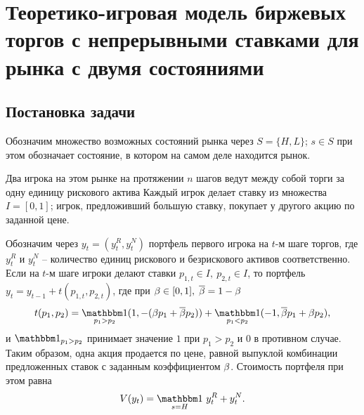 \chapter{Теоретико-игровая модель биржевых торгов с непрерывными ставками для
  рынка с двумя состояниями} \label{chapt2}
{
\newcommand{\Port}[1]{y_{#1}}
\newcommand*\dualFPS{\ensuremath{(P, \; \sigma)}}
\dualg[4][1=n, 2={\dualFPS}, 3=x, 4=\tau]{\ensuremath{g^*_{#1}(#3, #2, #4)}}
\newcommand*\dom{\ensuremath{\mathrm{dom\;}}}
\newcommand*\range{\ensuremath{\mathrm{range\;}}}


\section{Постановка задачи}
Обозначим множество возможных состояний рынка через $S = \{H, L\}$; $s \in S$ при этом обозначает состояние, в котором на самом деле находится рынок.

Два игрока на этом рынке на протяжении $n$ шагов ведут между собой торги за одну единицу рискового актива
Каждый игрок делает ставку из множества $I = [0, 1]$; игрок, предложивший большую ставку, покупает у другого акцию по заданной цене.

Обозначим через $\Port{t} = (\Port{t}^R, \Port{t}^N)$ портфель первого игрока на $t$-м шаге торгов, где $\Port{t}^R$ и $\Port{t}^N$ -- количество единиц рискового и безрискового активов соответственно.
Если на $t$-м шаге игроки делают ставки $p_{1,t} \in I, \: p_{2,t} \in I$, то портфель
$\Port{t} = \Port{t-1} + t(p_{1,t}, p_{2,t})$, где при $\beta \in [0, 1], \; {\overline{\beta}} = 1 - \beta$
\begin{equation}\label{eq:trans-mechanism}
  t(p_1, p_2) = \Ind_{p_1 > p_2} (1, -(\Co p_1 + \DCo p_2)) +
  \Ind_{p_1 < p_2} (-1, \DCo p_1 + \Co p_2),
\end{equation}
и $\Ind_{p_1 > p_2}$ принимает значение $1$ при $p_1 > p_2$ и $0$ в противном случае.
Таким образом, одна акция продается по цене, равной выпуклой комбинации предложенных ставок с заданным коэффициентом $\beta$.
Стоимость портфеля при этом равна
\begin{equation*}
  V(\Port{t})=\Ind_{s = H} \, \Port{t}^R + \Port{t}^N.
\end{equation*}

}
